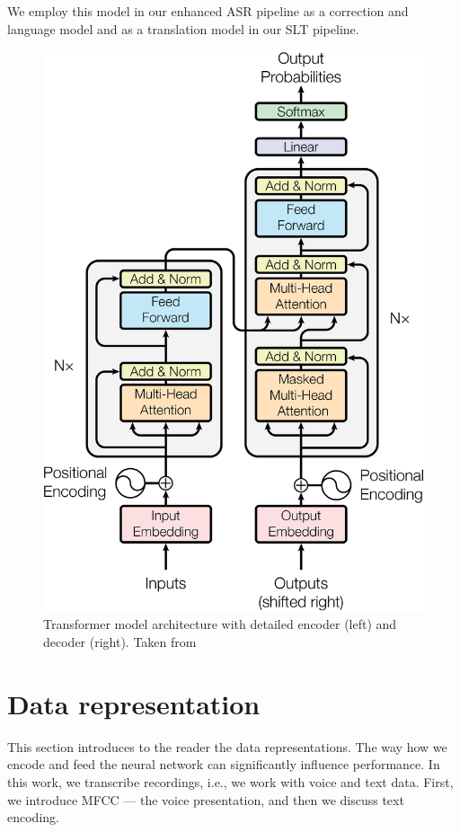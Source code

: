 We employ this model in our enhanced ASR pipeline as a correction and language model and as a translation model in our SLT pipeline. 

\begin{figure}[t]
	\centering
	\includegraphics[width=0.8\linewidth]{img/ModalNet-21.png}
	\caption{Transformer model architecture with detailed encoder (left) and decoder (right). Taken from }
	\label{fig:transformer}
\end{figure}





\pagebreak
\section{Data representation}
This section introduces to the reader the data representations. The way how we encode and feed the neural network can significantly influence performance. In this work, we transcribe recordings, i.e., we work with voice and text data. First, we introduce MFCC --- the voice presentation, and then we discuss text encoding.

